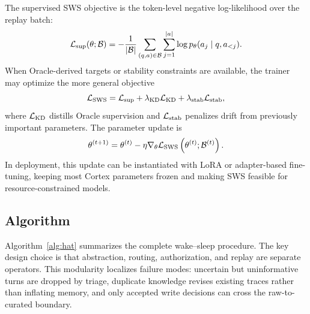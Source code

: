 The supervised SWS objective is the token-level negative log-likelihood over the replay batch:
\begin{equation}
  \mathcal{L}_{\mathrm{sup}}(\theta;\mathcal{B})
  =
  -
  \frac{1}{|\mathcal{B}|}
  \sum_{(q,a)\in\mathcal{B}}
  \sum_{j=1}^{|a|}
  \log p_{\theta}(a_j\mid q,a_{<j}).
  \label{eq:sws_supervised_loss}
\end{equation}
When Oracle-derived targets or stability constraints are available, the trainer may optimize the more general objective
\begin{equation}
  \mathcal{L}_{\mathrm{SWS}}
  =
  \mathcal{L}_{\mathrm{sup}}
  +
  \lambda_{\mathrm{KD}}\mathcal{L}_{\mathrm{KD}}
  +
  \lambda_{\mathrm{stab}}\mathcal{L}_{\mathrm{stab}},
  \label{eq:sws_full_objective}
\end{equation}
where $\mathcal{L}_{\mathrm{KD}}$ distills Oracle supervision and $\mathcal{L}_{\mathrm{stab}}$ penalizes drift from previously important parameters.
The parameter update is
\begin{equation}
  \theta^{(t+1)}
  =
  \theta^{(t)}
  -
  \eta \nabla_{\theta}
  \mathcal{L}_{\mathrm{SWS}}
  \left(\theta^{(t)};\mathcal{B}^{(t)}\right).
  \label{eq:sws_parameter_update}
\end{equation}
In deployment, this update can be instantiated with LoRA or adapter-based fine-tuning, keeping most Cortex parameters frozen and making SWS feasible for resource-constrained models.

\subsection{Algorithm}
\label{sec:method:algorithm}

Algorithm~\ref{alg:hat} summarizes the complete wake--sleep procedure.
The key design choice is that abstraction, routing, authorization, and replay are separate operators.
This modularity localizes failure modes: uncertain but uninformative turns are dropped by triage, duplicate knowledge revises existing traces rather than inflating memory, and only accepted write decisions can cross the raw-to-curated boundary.

